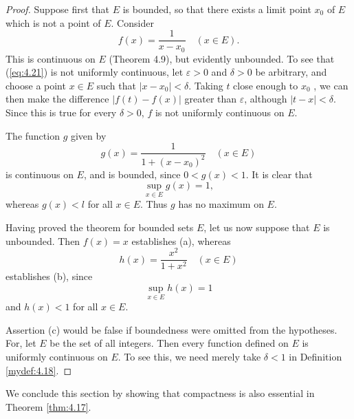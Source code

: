 \begin{proof}
    Suppose first that $E$ is bounded,
    so that there exists a limit point $x_0$ of $E$
    which is not a point of $E$.
    Consider
    \begin{equation}
        \label{eq:4.21}
        f(x) = \frac{1}{x - x_0}
        \quad
        (x \in E).
    \end{equation}
    This is continuous on $E$ (Theorem 4.9), but evidently unbounded.
    To see that (\ref{eq:4.21}) is not uniformly continuous,
    let $\varepsilon > 0$ and $\delta > 0$ be arbitrary,
    and choose a point $x \in E$ such that $\left| x - x_0 \right| < \delta$.
    Taking $t$ close enough to $x_0$ ,
    we can then make the difference $\left| f(t) - f(x) \right|$ greater than $\varepsilon$, although $\left| t-x \right| < \delta$.
    Since this is true for every $\delta > 0$,
    $f$ is not uniformly continuous on $E$.

    The function $g$ given by
    \begin{equation}
        \label{eq:4.22}
        g(x) = \frac{1}{1+(x-x_0)^2}
        \quad
        (x \in E)
    \end{equation}
    is continuous on $E$, and is bounded, since $0 < g(x) < 1$.
    It is clear that
    \begin{equation*}
        \sup_{x \in E} g(x) = 1,
    \end{equation*}
    whereas $g(x) < l$ for all $x \in E$. Thus $g$ has no maximum on $E$.

    Having proved the theorem for bounded sets $E$,
    let us now suppose that $E$ is unbounded.
    Then $f(x) = x$ establishes (a), whereas
    \begin{equation}
        \label{eq:4.23}
        h(x) = \frac{x^2}{1 + x^2}
        \quad
        (x \in E)
    \end{equation}
    establishes (b), since
    \begin{equation*}
        \sup_{x \in E} h(x) = 1
    \end{equation*}
    and $h(x) < 1$ for all $x \in E$.

    Assertion (c) would be false if boundedness were omitted from the
    hypotheses.
    For, let $E$ be the set of all integers.
    Then every function defined on $E$ is uniformly continuous on $E$.
    To see this, we need merely take $\delta < 1$ in Definition \ref{mydef:4.18}.
\end{proof}

We conclude this section by showing that compactness is also essential in
Theorem \ref{thm:4.17}.


